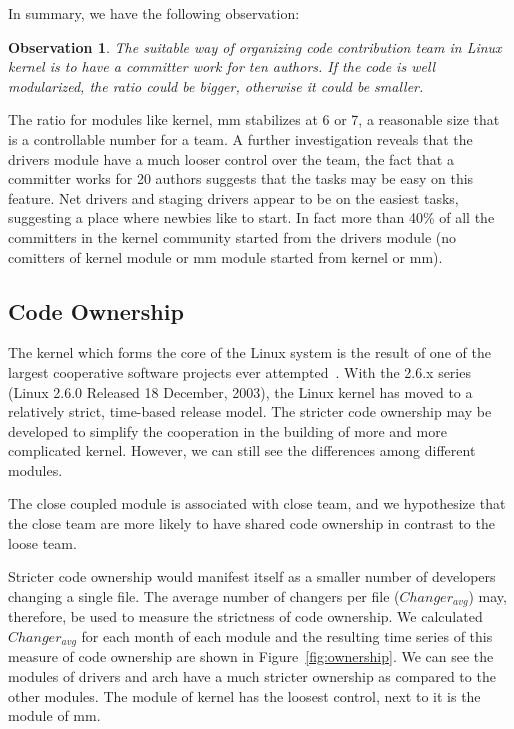 \documentclass{sig-alternate-05-2015}
\newtheorem{observation}{\bf Observation}
\begin{document}
In summary, we have the following observation:
\begin{observation}\label{o:1}
 The suitable way of organizing code contribution team in Linux kernel is
to have a committer work for ten authors. If the code is well modularized, 
the ratio could be bigger, otherwise it could be smaller.
\end{observation}

The ratio for modules like kernel, mm stabilizes at 6 or 7, a reasonable %
size that is a controllable number for a team.
A further investigation reveals that the drivers module have a much looser control over
the team, the fact that a committer works for 20 authors suggests that the tasks 
may be easy on this feature. Net drivers and staging drivers appear to be on
the easiest tasks, suggesting a place where newbies like to start. 
In fact more than 40\% of all the committers in the kernel community
started from the drivers module (no comitters of kernel module or mm module started from kernel or mm).

\subsection{Code Ownership}
 The kernel which forms the core of the Linux system is the result 
of one of the largest cooperative software
projects ever attempted~\cite{kerneldvp}.
With the 2.6.x series (Linux 2.6.0 Released 18 December, 2003), the Linux kernel has moved to a relatively 
strict,  time-based  release  model. 
The stricter code ownership may be developed to simplify the cooperation
in the building of more and more complicated kernel.
However, we can still see the differences among different modules.

The close coupled module is associated with close team, and we hypothesize 
that the close team are more likely to have shared code ownership in contrast
to the loose team.

Stricter code ownership would manifest itself as a smaller number of
developers changing a single file. The average number of changers
per file ($Changer_{avg}$) may, therefore, be used to measure the
strictness of code ownership. We calculated $Changer_{avg}$ for each
month of each module and the resulting time series of this measure of code
ownership are shown in Figure~\ref{fig:ownership}. 
We can see the modules of drivers and arch have a much stricter
ownership as compared to the other modules.
The module of kernel has the loosest control, next to it is the module of mm. 
\end{document}
